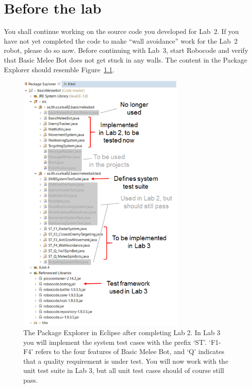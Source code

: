 \documentclass{scrreprt}
\begin{document}
\vspace{1em}
\vspace{1em}

\chapter{Before the lab}
You shall continue working on the source code you developed for Lab~2. If you have not yet completed the code to make ``wall avoidance'' work for the Lab~2 robot, please do so now. Before continuing with Lab~3, start Robocode and verify that Basic Melee Bot does not get stuck in any walls. The content in the Package Explorer should resemble Figure~\ref{fig:packageExplorer}.

\begin{figure}
\centering
\includegraphics[width=0.75\textwidth]{figures/packageExplorerAfterLab2.png}
\caption{The Package Explorer in Eclipse after completing Lab 2. In Lab 3 you will implement the system test cases with the prefix `ST'. `F1-F4' refers to the four features of Basic Melee Bot, and `Q' indicates that a quality requirement is under test. You will now work with the unit test suite in Lab 3, but all unit test cases should of course still pass.}
\label{fig:packageExplorer}
\end{figure}
\end{document}

